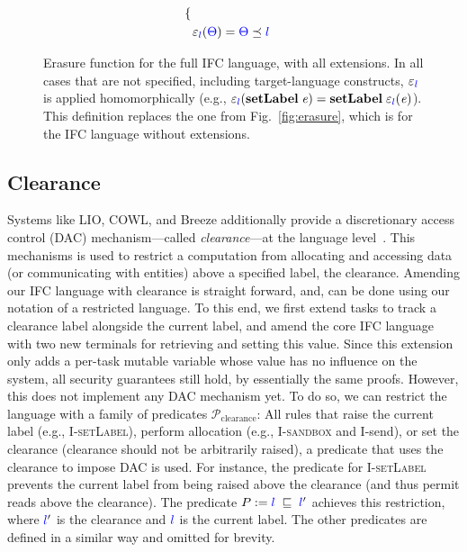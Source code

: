 \documentclass{llncs}
\newcommand{\Varid}[1]{\mathit{#1}}
\begin{document}
\begin{figure}
\begin{align*}
\begin{cases}
  \end{cases} \\
  &\varepsilon_{{\color{blue} l}}({\color{blue} \Theta})\mathrel{=}{\color{blue} \Theta}\preceq{\color{blue} l}
  \end{align*}
  \caption{Erasure function for the full IFC language, with all extensions.
    In all cases that are not specified, including target-language constructs,
    \ensuremath{\varepsilon_{\ifc{l}}} is applied homomorphically
    (e.g., \ensuremath{\varepsilon_{\ifc{l}}(\mathbf{setLabel}\;\Varid{e})\mathrel{=}\mathbf{setLabel}\;\varepsilon_{\ifc{l}}(\Varid{e})}).
    This definition replaces the one from Fig.~\ref{fig:erasure}, which
    is for the IFC language without extensions.}
  \label{fig:erasure2}
\end{figure}

\subsection{Clearance}
\label{sec:clearance}
Systems like LIO, COWL, and Breeze additionally provide a discretionary access
control (DAC) mechanism---called \emph{clearance}---at the language
level~\cite{Hritcu:2013:YIB:2497621.2498098, lio}.
This mechanisms is used to restrict a computation from allocating and
accessing data (or communicating with entities) above a specified
label, the clearance.
Amending our IFC language with clearance is straight forward,
and, can be done using our notation of a restricted language.
To this end, we first extend tasks to track a clearance label
alongside the current label, and amend the core IFC language with two
new terminals for retrieving and setting this value.
Since this extension only adds a per-task mutable variable whose value
has no influence on the system, all security guarantees still
hold, by essentially the same proofs.
However, this does not implement any DAC mechanism yet.
To do so, we can restrict the language with a family of predicates
$\mathcal{P}_\text{clearance}$:
All rules that
raise the current label (e.g., \textsc{I-setLabel}), perform
allocation (e.g., \textsc{I-sandbox} and \textsf{I-send}), or set the
clearance (clearance should not be arbitrarily raised), a predicate
that uses the clearance to impose DAC is used.
For instance, the predicate for \textsc{I-setLabel} prevents the
current label from being raised above the clearance (and thus permit
reads above the clearance).  The predicate $P := {\color{blue} l}\;\sqsubseteq{}\;{\color{blue} l}'$ achieves this restriction, where \ensuremath{\ifc{l}'} is the
clearance and \ensuremath{\ifc{l}} is the current
label.
The other predicates are defined in a similar way and omitted for
brevity.
\end{document}
